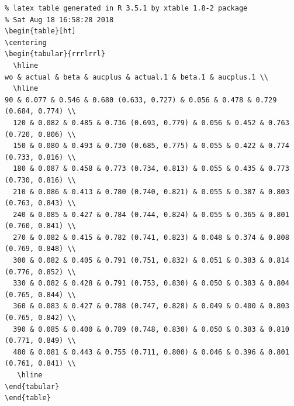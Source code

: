 \documentclass[12pt]{article}
\begin{document}
\begin{verbatim}
% latex table generated in R 3.5.1 by xtable 1.8-2 package
% Sat Aug 18 16:58:28 2018
\begin{table}[ht]
\centering
\begin{tabular}{rrrlrrl}
  \hline
wo & actual & beta & aucplus & actual.1 & beta.1 & aucplus.1 \\ 
  \hline
90 & 0.077 & 0.546 & 0.680 (0.633, 0.727) & 0.056 & 0.478 & 0.729 (0.684, 0.774) \\ 
  120 & 0.082 & 0.485 & 0.736 (0.693, 0.779) & 0.056 & 0.452 & 0.763 (0.720, 0.806) \\ 
  150 & 0.080 & 0.493 & 0.730 (0.685, 0.775) & 0.055 & 0.422 & 0.774 (0.733, 0.816) \\ 
  180 & 0.087 & 0.458 & 0.773 (0.734, 0.813) & 0.055 & 0.435 & 0.773 (0.730, 0.816) \\ 
  210 & 0.086 & 0.413 & 0.780 (0.740, 0.821) & 0.055 & 0.387 & 0.803 (0.763, 0.843) \\ 
  240 & 0.085 & 0.427 & 0.784 (0.744, 0.824) & 0.055 & 0.365 & 0.801 (0.760, 0.841) \\ 
  270 & 0.082 & 0.415 & 0.782 (0.741, 0.823) & 0.048 & 0.374 & 0.808 (0.769, 0.848) \\ 
  300 & 0.082 & 0.405 & 0.791 (0.751, 0.832) & 0.051 & 0.383 & 0.814 (0.776, 0.852) \\ 
  330 & 0.082 & 0.428 & 0.791 (0.753, 0.830) & 0.050 & 0.383 & 0.804 (0.765, 0.844) \\ 
  360 & 0.083 & 0.427 & 0.788 (0.747, 0.828) & 0.049 & 0.400 & 0.803 (0.765, 0.842) \\ 
  390 & 0.085 & 0.400 & 0.789 (0.748, 0.830) & 0.050 & 0.383 & 0.810 (0.771, 0.849) \\ 
  480 & 0.081 & 0.443 & 0.755 (0.711, 0.800) & 0.046 & 0.396 & 0.801 (0.761, 0.841) \\ 
   \hline
\end{tabular}
\end{table}
\end{verbatim}
\end{document}
